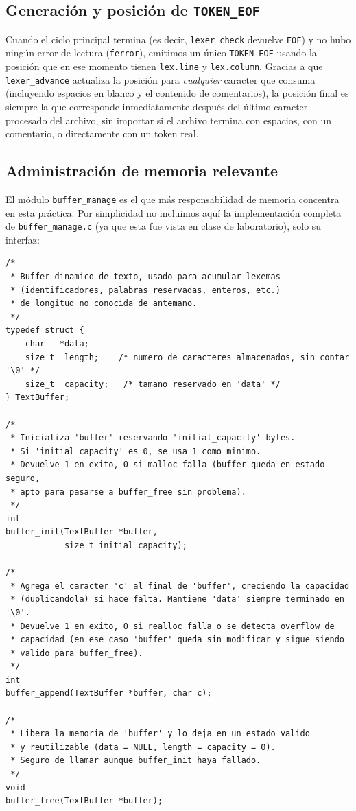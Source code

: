 \documentclass[12pt,letterpaper]{article}
\begin{document}
\subsection*{Generación y posición de \texttt{TOKEN\_EOF}}

Cuando el ciclo principal termina (es decir, \texttt{lexer\_check} devuelve \texttt{EOF}) y no hubo ningún
error de lectura (\texttt{ferror}), emitimos un único \texttt{TOKEN\_EOF} usando la posición que en ese
momento tienen \texttt{lex.line} y \texttt{lex.column}. Gracias a que \texttt{lexer\_advance} actualiza la
posición para \emph{cualquier} caracter que consuma (incluyendo espacios en blanco y el contenido de
comentarios), la posición final es siempre la que corresponde inmediatamente después del último caracter
procesado del archivo, sin importar si el archivo termina con espacios, con un comentario, o directamente con
un token real.

\subsection*{Administración de memoria relevante}

El módulo \texttt{buffer\_manage} es el que más responsabilidad de memoria concentra en esta práctica. Por
simplicidad no incluimos aquí la implementación completa de \texttt{buffer\_manage.c} (ya que esta fue vista en clase de laboratorio), solo su interfaz:

\begin{lstlisting}[style=modernc, caption={Interfaz de \texttt{buffer\_manage.h}: buffer dinámico de texto.}]
/*
 * Buffer dinamico de texto, usado para acumular lexemas
 * (identificadores, palabras reservadas, enteros, etc.)
 * de longitud no conocida de antemano.
 */
typedef struct {
    char   *data;
    size_t  length;    /* numero de caracteres almacenados, sin contar '\0' */
    size_t  capacity;   /* tamano reservado en 'data' */
} TextBuffer;

/*
 * Inicializa 'buffer' reservando 'initial_capacity' bytes.
 * Si 'initial_capacity' es 0, se usa 1 como minimo.
 * Devuelve 1 en exito, 0 si malloc falla (buffer queda en estado seguro,
 * apto para pasarse a buffer_free sin problema).
 */
int
buffer_init(TextBuffer *buffer,
            size_t initial_capacity);

/*
 * Agrega el caracter 'c' al final de 'buffer', creciendo la capacidad
 * (duplicandola) si hace falta. Mantiene 'data' siempre terminado en '\0'.
 * Devuelve 1 en exito, 0 si realloc falla o se detecta overflow de
 * capacidad (en ese caso 'buffer' queda sin modificar y sigue siendo
 * valido para buffer_free).
 */
int
buffer_append(TextBuffer *buffer, char c);

/*
 * Libera la memoria de 'buffer' y lo deja en un estado valido
 * y reutilizable (data = NULL, length = capacity = 0).
 * Seguro de llamar aunque buffer_init haya fallado.
 */
void
buffer_free(TextBuffer *buffer);
\end{lstlisting}
\end{document}
